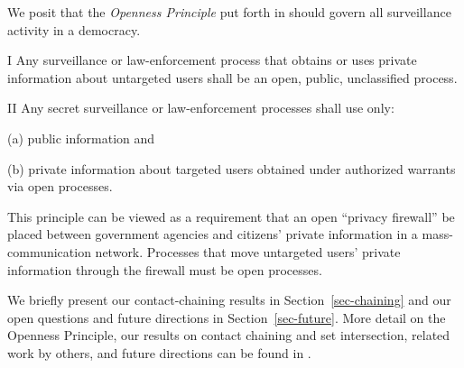 We posit that the
{\it Openness Principle} put forth in \cite{sff-foci2014} 
should govern all surveillance activity in a democracy.
\begin{compactenum}
\item[I]
Any surveillance or law-enforcement process
that obtains or uses private information
about untargeted users shall be
an open, public, unclassified process.
\item[II]
Any secret surveillance or law-enforcement processes shall use only:
\begin{compactenum}
\item[(a)] public information and
\item[(b)] private information about targeted users obtained under 
authorized warrants via open processes.
\end{compactenum}
\end{compactenum}
This principle can be viewed as a requirement that an open
``privacy firewall'' be placed between government agencies and citizens'
private information in a mass-communication network.  Processes that move
untargeted users' private information through the firewall must be open
processes.  

We briefly present our contact-chaining results in 
Section~\ref{sec-chaining} and our open questions and future directions
in Section~\ref{sec-future}.  More detail on the Openness
Principle, our results on contact chaining and set intersection, related 
work by others, and future directions can be found in 
\cite{sff-TR,sff-foci2014}.
